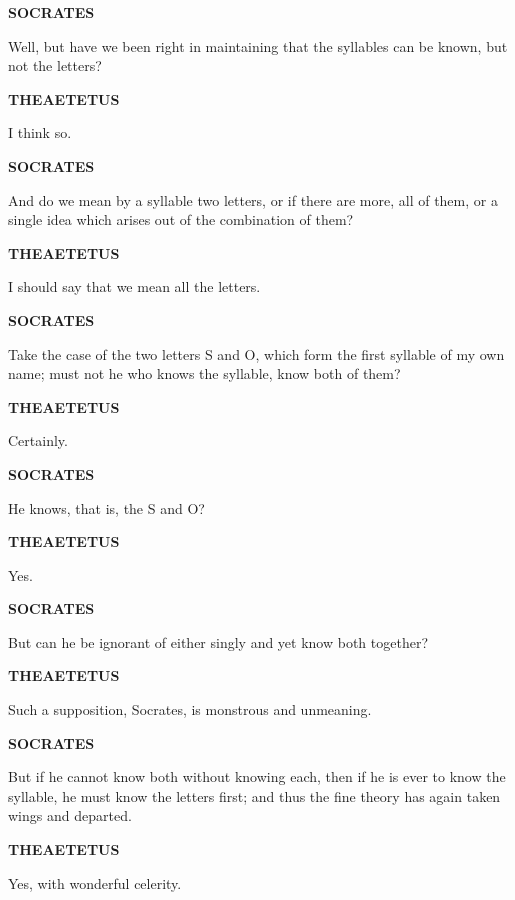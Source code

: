 \documentclass[11pt,letter]{article}
\begin{document}
\par \textbf{SOCRATES}
\par   Well, but have we been right in maintaining that the syllables can be known, but not the letters?

\par \textbf{THEAETETUS}
\par   I think so.

\par \textbf{SOCRATES}
\par   And do we mean by a syllable two letters, or if there are more, all of them, or a single idea which arises out of the combination of them?

\par \textbf{THEAETETUS}
\par   I should say that we mean all the letters.

\par \textbf{SOCRATES}
\par   Take the case of the two letters S and O, which form the first syllable of my own name; must not he who knows the syllable, know both of them?

\par \textbf{THEAETETUS}
\par   Certainly.

\par \textbf{SOCRATES}
\par   He knows, that is, the S and O?

\par \textbf{THEAETETUS}
\par   Yes.

\par \textbf{SOCRATES}
\par   But can he be ignorant of either singly and yet know both together?

\par \textbf{THEAETETUS}
\par   Such a supposition, Socrates, is monstrous and unmeaning.

\par \textbf{SOCRATES}
\par   But if he cannot know both without knowing each, then if he is ever to know the syllable, he must know the letters first; and thus the fine theory has again taken wings and departed.

\par \textbf{THEAETETUS}
\par   Yes, with wonderful celerity.
\end{document}
